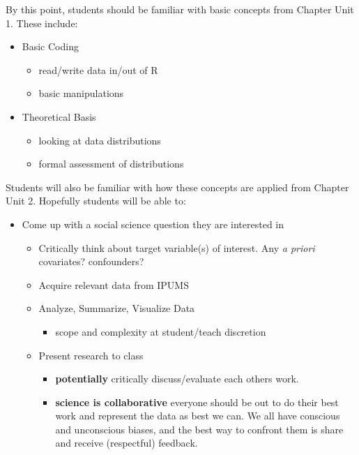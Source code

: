 \documentclass[
]{book}
\providecommand{\tightlist}{%
  \setlength{\itemsep}{0pt}\setlength{\parskip}{0pt}}
\begin{document}
By this point, students should be familiar with basic concepts from Chapter Unit 1. These include:

\begin{itemize}
\tightlist
\item
  Basic Coding

  \begin{itemize}
  \tightlist
  \item
    read/write data in/out of R
  \item
    basic manipulations
  \end{itemize}
\item
  Theoretical Basis

  \begin{itemize}
  \tightlist
  \item
    looking at data distributions
  \item
    formal assessment of distributions
  \end{itemize}
\end{itemize}

Students will also be familiar with how these concepts are applied from Chapter Unit 2. Hopefully students will be able to:

\begin{itemize}
\tightlist
\item
  Come up with a social science question they are interested in

  \begin{itemize}
  \tightlist
  \item
    Critically think about target variable(s) of interest. Any \emph{a priori} covariates? confounders?
  \item
    Acquire relevant data from IPUMS
  \item
    Analyze, Summarize, Visualize Data

    \begin{itemize}
    \tightlist
    \item
      scope and complexity at student/teach discretion
    \end{itemize}
  \item
    Present research to class

    \begin{itemize}
    \tightlist
    \item
      \textbf{potentially} critically discuss/evaluate each others work.
    \item
      \textbf{science is collaborative} everyone should be out to do their best work and represent the data as best we can. We all have conscious and unconscious biases, and the best way to confront them is share and receive (respectful) feedback.
    \end{itemize}
  \end{itemize}
\end{itemize}
\end{document}
